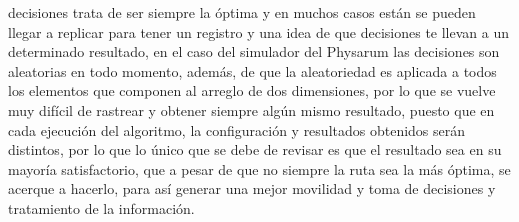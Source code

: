         decisiones trata de ser siempre la \'optima y en muchos casos
        est\'an se pueden llegar a replicar para tener un registro y una
        idea de que decisiones te llevan a un determinado resultado,
        en el caso del simulador del Physarum las decisiones son
        aleatorias en todo momento, adem\'as, de que la aleatoriedad
        es aplicada a todos los elementos que componen al arreglo
        de dos dimensiones, por lo que se vuelve muy dif\'icil de
        rastrear y obtener siempre alg\'un mismo resultado, puesto
        que en cada ejecuci\'on del algoritmo, la configuraci\'on y
        resultados obtenidos ser\'an distintos, por lo que lo \'unico que 
        se debe de revisar es que el resultado sea en su mayor\'ia
        satisfactorio, que a pesar de que no siempre la ruta sea la
        m\'as \'optima, se acerque a hacerlo, para as\'i generar una mejor
        movilidad y toma de decisiones y tratamiento de la
        informaci\'on.
    \vskip 0.5cm